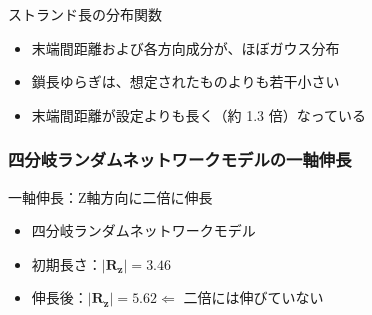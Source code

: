 \documentclass[11pt, dvipdfmx]{beamer}
\begin{document}
\begin{frame}
\vspace{-2mm}
\begin{exampleblock}{ストランド長の分布関数}
\begin{itemize}
\item
末端間距離および各方向成分が、ほぼガウス分布
\item
鎖長ゆらぎは、想定されたものよりも若干小さい
\item
末端間距離が設定よりも長く（約 1.3 倍）なっている
\end{itemize}
\end{exampleblock}

\end{frame}

\begin{frame}
\frametitle{四分岐ランダムネットワークモデルの一軸伸長}
\small
\begin{exampleblock}{一軸伸長：Z軸方向に二倍に伸長}
	\begin{itemize}
	\item
	四分岐ランダムネットワークモデル
	\item
	初期長さ：$|\bm{R_z}| = 3.46$
	\item
	伸長後：$|\bm{R_z}| = 5.62 \Leftarrow$ \alert{二倍には伸びていない}
	\end{itemize}
\end{exampleblock}



\end{frame}
\end{document}
